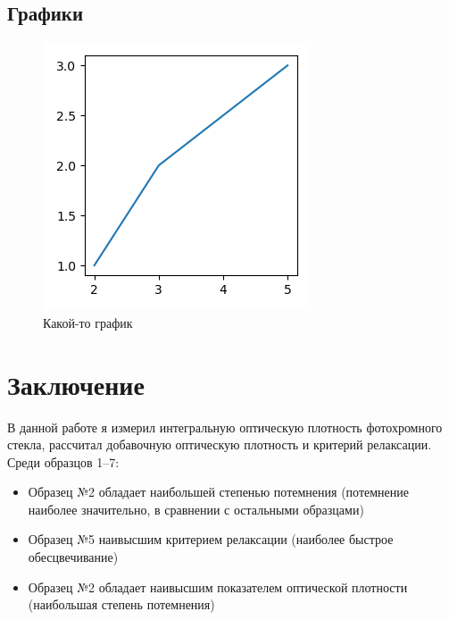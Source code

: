 \subsection{Графики}\label{subsec:графики}

\begin{figure}
        \centering
        \includegraphics{figures/example}
        \caption{Какой-то график}
		\label{fig:someFigure}
\end{figure}

\section*{Заключение}
В данной работе я измерил интегральную оптическую плотность фотохромного стекла, рассчитал добавочную оптическую плотность и критерий релаксации.
Среди образцов 1--7:
\begin{itemize}
	\item Образец №2 обладает наибольшей степенью потемнения (потемнение наиболее значительно, в сравнении с остальными образцами)
	\item Образец №5 наивысшим критерием релаксации (наиболее быстрое обесцвечивание)
	\item Образец №2 обладает наивысшим показателем оптической плотности (наибольшая степень потемнения)
\end{itemize}

